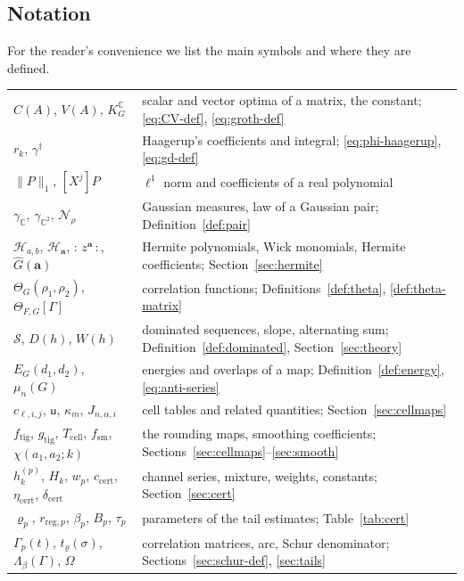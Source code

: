 \documentclass[11pt,reqno]{amsart}
\theoremstyle{definition}
\numberwithin{equation}{section}
\newcommand{\C}{\mathbb{C}}
\newcommand{\KGC}{K_G^{\C}}
\newcommand{\gd}{\gamma^\dagger}
\newcommand{\gC}{\gamma_{\C}}
\newcommand{\gCC}{\gamma_{\C^2}}
\newcommand{\wick}[1]{{:}\,#1\,{:}}
\newcommand{\lone}[1]{\|#1\|_1}
\newcommand{\Scl}{\mathcal{S}}
\newcommand{\Om}{\Omega}
\newcommand{\Tcell}{T_{\mathrm{cell}}}
\newcommand{\ftig}{f_{\mathrm{tig}}}
\newcommand{\gtig}{g_{\mathrm{tig}}}
\newcommand{\fsm}{f_{\mathrm{sm}}}
\newcommand{\ccert}{c_{\mathrm{cert}}}
\newcommand{\dcert}{\delta_{\mathrm{cert}}}
\begin{document}
\subsection{Notation}\label{sec:notation}
For the reader's convenience we list the main symbols and where they are defined.
\begin{center}
\small
\begin{tabular}{@{}ll@{}}
\toprule
$C(A)$, $V(A)$, $\KGC$ & scalar and vector optima of a matrix, the constant; \eqref{eq:CV-def}, \eqref{eq:groth-def}\\
$r_k$, $\gd$ & Haagerup's coefficients and integral; \eqref{eq:phi-haagerup}, \eqref{eq:gd-def}\\
$\lone{P}$, $[X^j]P$ & $\ell^1$ norm and coefficients of a real polynomial\\
$\gC$, $\gCC$, $\mathcal{N}_\rho$ & Gaussian measures, law of a Gaussian pair; Definition~\ref{def:pair}\\
$\mathcal{H}_{a,b}$, $\mathcal{H}_{\mathbf{a}}$, $\wick{z^{\mathbf{a}}}$, $\widehat G(\mathbf{a})$ & Hermite polynomials, Wick monomials, Hermite coefficients; Section~\ref{sec:hermite}\\
$\Theta_G(\rho_1,\rho_2)$, $\Theta_{F,G}[\Gamma]$ & correlation functions; Definitions~\ref{def:theta}, \ref{def:theta-matrix}\\
$\Scl$, $D(h)$, $W(h)$ & dominated sequences, slope, alternating sum; Definition~\ref{def:dominated}, Section~\ref{sec:theory}\\
$E_G(d_1,d_2)$, $\mu_n(G)$ & energies and overlaps of a map; Definition~\ref{def:energy}, \eqref{eq:anti-series}\\
$c_{\ell,i,j}$, $\mathsf{u}$, $\kappa_m$, $J_{n,\alpha,i}$ & cell tables and related quantities; Section~\ref{sec:cellmaps}\\
$\ftig$, $\gtig$, $\Tcell$, $\fsm$, $\chi(a_1,a_2;k)$ & the rounding maps, smoothing coefficients; Sections~\ref{sec:cellmaps}--\ref{sec:smooth}\\
$h^{(p)}_k$, $H_k$, $w_p$, $\ccert$, $\eta_{\mathrm{cert}}$, $\dcert$ & channel series, mixture, weights, constants; Section~\ref{sec:cert}\\
$\varrho_p$, $r_{\mathrm{reg},p}$, $\beta_p$, $B_p$, $\tau_p$ & parameters of the tail estimates; Table~\ref{tab:cert}\\
$\Gamma_p(t)$, $t_\varrho(\sigma)$, $\Lambda_\beta(\Gamma)$, $\Om$ & correlation matrices, arc, Schur denominator; Sections~\ref{sec:schur-def}, \ref{sec:tails}\\
\bottomrule
\end{tabular}
\end{center}
\end{document}

